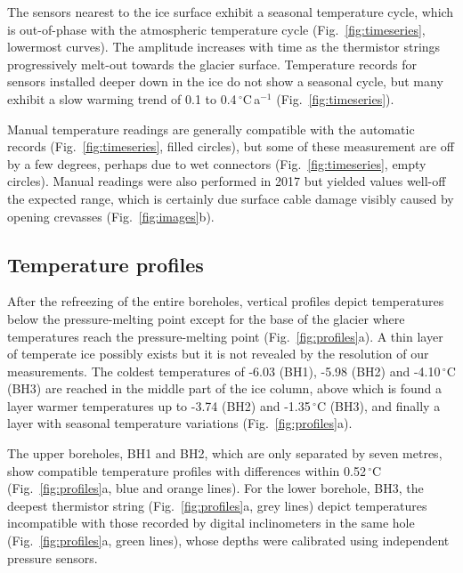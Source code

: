 \documentclass[utf8]{article}
\begin{document}
    The sensors nearest to the ice surface exhibit a seasonal temperature
    cycle, which is out-of-phase with the atmospheric temperature cycle
    (Fig.~\ref{fig:timeseries}, lowermost curves). The
    amplitude increases with time as the thermistor strings progressively
    melt-out towards the glacier surface. Temperature records for sensors
    installed deeper
    down in the ice do not show a seasonal cycle, but many exhibit a slow
    warming trend of 0.1 to 0.4\,$^\circ$C\,a$^{-1}$
    (Fig.~\ref{fig:timeseries}).

    Manual temperature readings are generally compatible with the automatic
    records (Fig.~\ref{fig:timeseries}, filled circles), but some of these
    measurement are off by a few degrees, perhaps due to wet connectors
    (Fig.~\ref{fig:timeseries}, empty circles). Manual readings were also
    performed in 2017 but yielded values well-off the expected range, which
    is certainly due surface cable damage visibly caused by opening crevasses
    (Fig.~\ref{fig:images}b).


\subsection{Temperature profiles}

    After the refreezing of the entire boreholes, vertical profiles depict
    temperatures below the pressure-melting point except for the base of the
    glacier where temperatures reach the pressure-melting point
    (Fig.~\ref{fig:profiles}a). A thin layer of temperate ice possibly exists
    but it is not revealed by the resolution of our measurements. The coldest
    temperatures of -6.03 (BH1), -5.98 (BH2) and -4.10\,$^\circ$C (BH3)
    are reached in the middle part of the ice column, above which
    is found a layer warmer temperatures up to -3.74 (BH2) and -1.35\,$^\circ$C
    (BH3), and finally a layer with
    seasonal temperature variations (Fig.~\ref{fig:profiles}a).

    The upper boreholes, BH1 and BH2, which are only separated by seven metres,
    show compatible temperature profiles with differences within 0.52\,$^\circ$C
    (Fig.~\ref{fig:profiles}a, blue and
    orange lines). For the lower borehole, BH3, the deepest thermistor string
    (Fig.~\ref{fig:profiles}a, grey lines) depict temperatures incompatible
    with those recorded by digital inclinometers in the same hole
    (Fig.~\ref{fig:profiles}a, green lines), whose depths were calibrated
    using independent pressure sensors.
\end{document}

